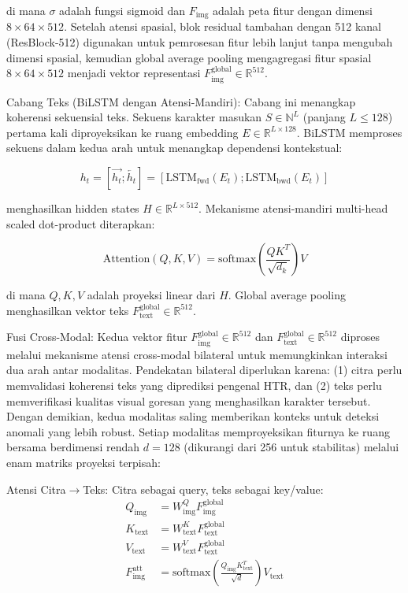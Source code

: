 \documentclass[journal]{IEEEtran}
\begin{document}
\noindent di mana $\sigma$ adalah fungsi sigmoid dan $F_{\text{img}}$ adalah peta fitur dengan dimensi $8 \times 64 \times 512$. Setelah atensi spasial, blok residual tambahan dengan 512 kanal (ResBlock-512) digunakan untuk pemrosesan fitur lebih lanjut tanpa mengubah dimensi spasial, kemudian global average pooling mengagregasi fitur spasial $8 \times 64 \times 512$ menjadi vektor representasi $F_{\text{img}}^{\text{global}} \in \mathbb{R}^{512}$.

Cabang Teks (BiLSTM dengan Atensi-Mandiri): Cabang ini menangkap koherensi sekuensial teks. Sekuens karakter masukan $S \in \mathbb{N}^{L}$ (panjang $L \leq 128$) pertama kali diproyeksikan ke ruang embedding $E \in \mathbb{R}^{L \times 128}$. BiLSTM memproses sekuens dalam kedua arah untuk menangkap dependensi kontekstual:

\begin{equation}
h_t = [\overrightarrow{h_t}; \overleftarrow{h_t}] = [\text{LSTM}_{\text{fwd}}(E_t); \text{LSTM}_{\text{bwd}}(E_t)]
\end{equation}

\noindent menghasilkan hidden states $H \in \mathbb{R}^{L \times 512}$. Mekanisme atensi-mandiri multi-head scaled dot-product diterapkan:

\begin{equation}
\text{Attention}(Q, K, V) = \text{softmax}\left(\frac{QK^T}{\sqrt{d_k}}\right)V
\end{equation}

\noindent di mana $Q, K, V$ adalah proyeksi linear dari $H$. Global average pooling menghasilkan vektor teks $F_{\text{text}}^{\text{global}} \in \mathbb{R}^{512}$.

Fusi Cross-Modal: Kedua vektor fitur $F_{\text{img}}^{\text{global}} \in \mathbb{R}^{512}$ dan $F_{\text{text}}^{\text{global}} \in \mathbb{R}^{512}$ diproses melalui mekanisme atensi cross-modal bilateral untuk memungkinkan interaksi dua arah antar modalitas. Pendekatan bilateral diperlukan karena: (1) citra perlu memvalidasi koherensi teks yang diprediksi pengenal HTR, dan (2) teks perlu memverifikasi kualitas visual goresan yang menghasilkan karakter tersebut. Dengan demikian, kedua modalitas saling memberikan konteks untuk deteksi anomali yang lebih robust. Setiap modalitas memproyeksikan fiturnya ke ruang bersama berdimensi rendah $d=128$ (dikurangi dari 256 untuk stabilitas) melalui enam matriks proyeksi terpisah:

Atensi Citra$\rightarrow$Teks: Citra sebagai query, teks sebagai key/value:
\begin{align}
Q_{\text{img}} &= W_{\text{img}}^Q F_{\text{img}}^{\text{global}} \nonumber\\
K_{\text{text}} &= W_{\text{text}}^K F_{\text{text}}^{\text{global}} \nonumber\\
V_{\text{text}} &= W_{\text{text}}^V F_{\text{text}}^{\text{global}} \label{eq:cross_img_proj}\\
F_{\text{img}}^{\text{att}} &= \text{softmax}\left(\frac{Q_{\text{img}} K_{\text{text}}^T}{\sqrt{d}}\right) V_{\text{text}} \label{eq:cross_img_att}
\end{align}
\end{document}
